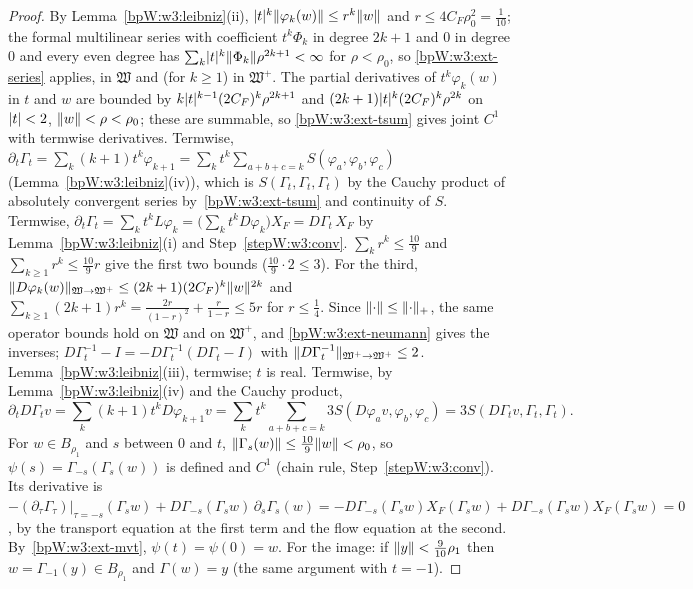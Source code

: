 \begin{proof}
\label{stepW:w3:conv}
By Lemma~\ref{bpW:w3:leibniz}(ii), $\lvert t\rvert^k\lVert \varphi_k(w)\rVert\le r^k\lVert w\rVert$ and $r\le4C_F\rho_0^2=\frac1{10}$;
the formal multilinear series with coefficient $t^k\Phi_k$ in degree $2k+1$ and $0$ in degree $0$ and every even
degree has $\sum_k\lvert t\rvert^k\lVert \Phi_k\rVert\rho^{2k+1}<\infty$ for $\rho<\rho_0$, so
\ref{bpW:w3:ext-series} applies, in $\mathfrak W$ and (for $k\ge1$) in $\mathfrak W^+$. The partial derivatives of
$t^k\varphi_k(w)$ in $t$ and $w$ are bounded by $k\lvert t\rvert^{k-1}(2C_F)^k\rho^{2k+1}$ and
$(2k+1)\lvert t\rvert^k(2C_F)^k\rho^{2k}$ on $\lvert t\rvert<2$, $\lVert w\rVert<\rho<\rho_0$; these are summable, so
\ref{bpW:w3:ext-tsum} gives joint $C^1$ with termwise derivatives.
\label{stepW:w3:floweq}
Termwise, $\partial_t\Gamma_t=\sum_k(k+1)t^k\varphi_{k+1}=\sum_kt^k\sum_{a+b+c=k}S(\varphi_a,\varphi_b,\varphi_c)$
(Lemma~\ref{bpW:w3:leibniz}(iv)), which is $S(\Gamma_t,\Gamma_t,\Gamma_t)$ by the Cauchy product of absolutely
convergent series by~\ref{bpW:w3:ext-tsum} and continuity of $S$.
\label{stepW:w3:transport}
Termwise, $\partial_t\Gamma_t=\sum_kt^kL\varphi_k=\bigl(\sum_kt^kD\varphi_k\bigr)X_F=D\Gamma_t\,X_F$ by
Lemma~\ref{bpW:w3:leibniz}(i) and Step~\ref{stepW:w3:conv}.
\label{stepW:w3:est}
$\sum_kr^k\le\frac{10}9$ and $\sum_{k\ge1}r^k\le\frac{10}9r$ give the first two bounds
($\frac{10}9\cdot2\le3$). For the third, $\lVert D\varphi_k(w)\rVert_{\mathfrak W\to\mathfrak W^+}\le(2k+1)(2C_F)^k\lVert w\rVert^{2k}$
and $\sum_{k\ge1}(2k+1)r^k=\frac{2r}{(1-r)^2}+\frac r{1-r}\le5r$ for $r\le\frac14$. Since
$\lVert \cdot\rVert\le\lVert \cdot\rVert_+$, the same operator bounds hold on $\mathfrak W$ and on $\mathfrak W^+$, and
\ref{bpW:w3:ext-neumann} gives the inverses; $D\Gamma_t^{-1}-I=-D\Gamma_t^{-1}(D\Gamma_t-I)$ with
$\lVert D\Gamma_t^{-1}\rVert_{\mathfrak W^+\to\mathfrak W^+}\le2$.
\label{stepW:w3:Greal}
Lemma~\ref{bpW:w3:leibniz}(iii), termwise; $t$ is real.
\label{stepW:w3:var}
Termwise, by Lemma~\ref{bpW:w3:leibniz}(iv) and the Cauchy product,
\[\partial_tD\Gamma_tv=\sum_k(k+1)t^kD\varphi_{k+1}v=\sum_kt^k\sum_{a+b+c=k}3S(D\varphi_av,\varphi_b,\varphi_c)
=3S(D\Gamma_tv,\Gamma_t,\Gamma_t).\]
\label{stepW:w3:inv}
For $w\in B_{\rho_1}$ and $s$ between $0$ and $t$, $\lVert \Gamma_s(w)\rVert\le\frac{10}9\lVert w\rVert<\rho_0$, so
$\psi(s)=\Gamma_{-s}(\Gamma_s(w))$ is defined and $C^1$ (chain rule, Step~\ref{stepW:w3:conv}). Its derivative is
$-(\partial_\tau\Gamma_\tau)|_{\tau=-s}(\Gamma_sw)+D\Gamma_{-s}(\Gamma_sw)\,\partial_s\Gamma_s(w)
=-D\Gamma_{-s}(\Gamma_sw)X_F(\Gamma_sw)+D\Gamma_{-s}(\Gamma_sw)X_F(\Gamma_sw)=0$, by the transport equation at the
first term and the flow equation at the second. By~\ref{bpW:w3:ext-mvt}, $\psi(t)=\psi(0)=w$. For the image: if
$\lVert y\rVert<\frac{9}{10}\rho_1$ then $w=\Gamma_{-1}(y)\in B_{\rho_1}$ and $\Gamma(w)=y$ (the same argument with
$t=-1$).
\end{proof}
